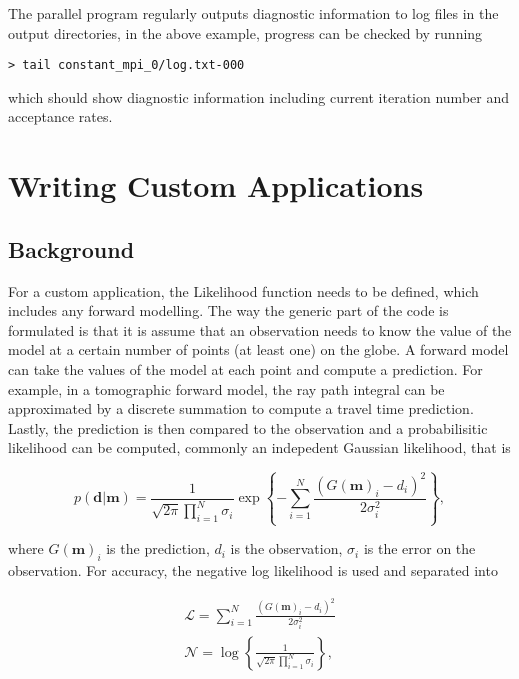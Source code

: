 \documentclass{article}
\begin{document}
The parallel program regularly outputs diagnostic information to log files in the
output directories, in the above example, progress can be checked by running

\begin{verbatim}
> tail constant_mpi_0/log.txt-000
\end{verbatim}

which should show diagnostic information including current iteration number and
acceptance rates.

\section{Writing Custom Applications}

\subsection{Background}

For a custom application, the Likelihood function needs to be defined, which
includes any forward modelling. The way the generic part of the code is formulated
is that it is assume that an observation needs to know the value of the model
at a certain number of points (at least one) on the globe. A forward model
can take the values of the model at each point and compute a prediction. For
example, in a tomographic forward model, the ray path integral can be approximated by a discrete
summation to compute a travel time prediction. Lastly, the prediction is then
compared to the observation and a probabilisitic likelihood can be computed, commonly
an indepedent Gaussian likelihood, that is

\begin{equation}
  p(\mathbf{d}|\mathbf{m}) = \frac{1}{\sqrt{2 \pi} \prod_{i=1}^N \sigma_i} \exp \left\{
  - \sum_{i = 1}^N \frac{(G(\mathbf{m})_i - d_i)^2}{2\sigma_i^2} \right\}
    ,
\end{equation}

where $G(\mathbf{m})_i$ is the prediction, $d_i$ is the observation, $\sigma_i$ is the
error on the observation. For accuracy, the negative log likelihood is used and separated
into

\begin{align}
  \label{eqn:like}
  \mathcal{L} = \sum_{i = 1}^N \frac{(G(\mathbf{m})_i - d_i)^2}{2\sigma_i^2} \\
  \label{eqn:norm}
  \mathcal{N} = \log \left\{ \frac{1}{\sqrt{2 \pi} \prod_{i=1}^N \sigma_i} \right\}
  ,
\end{align}
\end{document}
